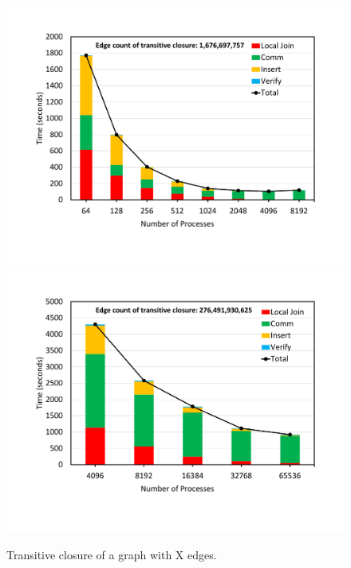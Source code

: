 \begin{figure}[t]
	{\includegraphics[width=.50\textwidth,  trim={0cm 0cm 0cm 0cm, 
			clip}]{results/TC_1_6_Billion_final.pdf}}\hfill%
	{\includegraphics[width=.50\textwidth,  trim={0cm 0cm 0cm 0cm,
			clip}]{results/TC_260Billion_Final.pdf}}\hfill%
	\centering
	\caption{Transitive closure of a graph with X edges.}
	\label{fig:tc_small}
\end{figure}


